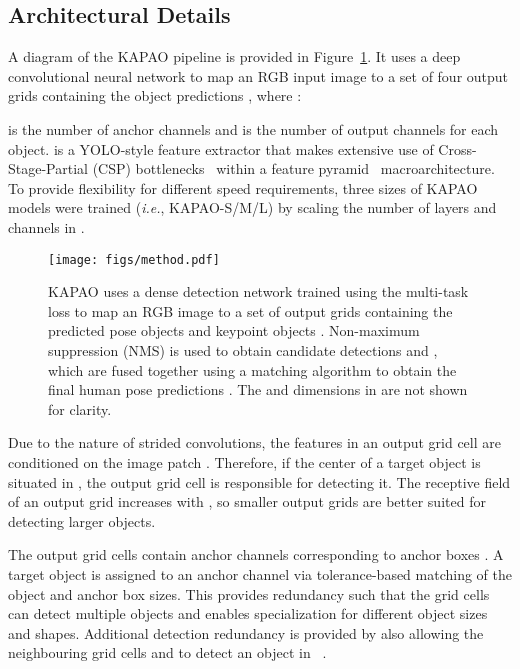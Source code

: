 \documentclass[runningheads]{llncs}
\newcommand{\ie}{\textit{i.e.}}
\begin{document}
\subsection{Architectural Details}
\label{sec:kapao_arch}
A diagram of the KAPAO pipeline is provided in Figure~\ref{fig:kapao_method}. It uses a deep convolutional neural network  to map an RGB input image  to a set of four output grids  containing the object predictions , where :

 is the number of anchor channels and  is the number of output channels for each object.  is a YOLO-style feature extractor that makes extensive use of Cross-Stage-Partial (CSP) bottlenecks~\cite{wang2020cspnet} within a feature pyramid~\cite{lin2017feature} macroarchitecture. To provide flexibility for different speed requirements, three sizes of KAPAO models were trained (\ie, KAPAO-S/M/L) by scaling the number of layers and channels in . 


\begin{figure}[t]
\centering
    \texttt{[image: figs/method.pdf]}
\caption[Schematic of the KAPAO methodology.]{KAPAO uses a dense detection network  trained using the multi-task loss  to map an RGB image  to a set of output grids  containing the predicted pose objects  and keypoint objects . Non-maximum suppression (NMS) is used to obtain candidate detections  and , which are fused together using a matching algorithm  to obtain the final human pose predictions . The  and  dimensions in  are not shown for clarity.}
\label{fig:kapao_method}
\end{figure}

Due to the nature of strided convolutions, the features in an output grid cell  are conditioned on the image patch . Therefore, if the center of a target object  is situated in , the output grid cell  is responsible for detecting it. 
The receptive field of an output grid increases with , so smaller output grids are better suited for detecting larger objects. 


The output grid cells  contain  anchor channels corresponding to anchor boxes . A target object  is assigned to an anchor channel via tolerance-based matching of the object and anchor box sizes. This provides redundancy such that the grid cells  can detect multiple objects and enables specialization for different object sizes and shapes. Additional detection redundancy is provided by also allowing the neighbouring grid cells  and  to detect an object in ~\cite{wang2020scaled, glenn_jocher_2021_4679653}.
\end{document}
